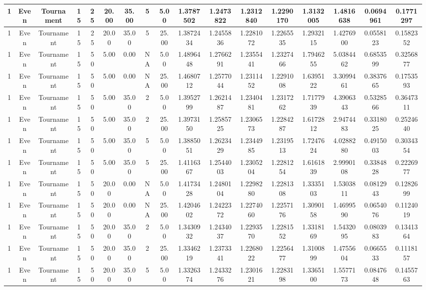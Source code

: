 \documentclass[a4paper]{article}
\begin{document}
\begin{center}
\begin{tabular}{ | c | c | c | c | c | c | c | c | c | c | c | c | c | c | c | c | c | }
		\hline
		1	&	Even	&	Tournament	&	15	&	25	&	20.00	&	35.00	&	5	&	5.00	&	1.3787502	&	1.2473822	&	1.2312840	&	1.2290170	&	1.3132005	&	1.4816638	&	0.0694961	&	0.1771297 \\
		\hline
		1	&	Even	&	Tournament	&	15	&	25	&	20.00	&	35.00	&	5	&	25.00	&	1.3872434	&	1.2455836	&	1.2281072	&	1.2265535	&	1.2932115	&	1.4276900	&	0.0558123	&	0.1582352 \\
		\hline
		1	&	Even	&	Tournament	&	15	&	50	&	5.00	&	0.00	&	NA	&	5.00	&	1.4896448	&	1.2766291	&	1.2355441	&	1.2327466	&	1.7946255	&	5.0384462	&	0.6853599	&	0.3256877 \\
		\hline
		1	&	Even	&	Tournament	&	15	&	50	&	5.00	&	0.00	&	NA	&	25.00	&	1.4680712	&	1.2577044	&	1.2311452	&	1.2291008	&	1.6395122	&	3.3099461	&	0.3837665	&	0.1753593 \\
		\hline
		1	&	Even	&	Tournament	&	15	&	50	&	5.00	&	35.00	&	2	&	5.00	&	1.3952799	&	1.2621487	&	1.2340481	&	1.2317262	&	1.7177939	&	4.3906343	&	0.5328566	&	0.3647311 \\
		\hline
		1	&	Even	&	Tournament	&	15	&	50	&	5.00	&	35.00	&	2	&	25.00	&	1.3973150	&	1.2585725	&	1.2306573	&	1.2284287	&	1.6172812	&	2.9474483	&	0.3318025	&	0.2524640 \\
		\hline
		1	&	Even	&	Tournament	&	15	&	50	&	5.00	&	35.00	&	5	&	5.00	&	1.3885051	&	1.2623429	&	1.2344985	&	1.2319513	&	1.7247624	&	4.0288280	&	0.4915003	&	0.3034354 \\
		\hline
		1	&	Even	&	Tournament	&	15	&	50	&	5.00	&	35.00	&	5	&	25.00	&	1.4116367	&	1.2544003	&	1.2305204	&	1.2281254	&	1.6161839	&	2.9990108	&	0.3384828	&	0.2226977 \\
		\hline
		1	&	Even	&	Tournament	&	15	&	50	&	20.00	&	0.00	&	NA	&	5.00	&	1.4173428	&	1.2480104	&	1.2298280	&	1.2281308	&	1.3335103	&	1.5303811	&	0.0812943	&	0.1282699 \\
		\hline
		1	&	Even	&	Tournament	&	15	&	50	&	20.00	&	0.00	&	NA	&	25.00	&	1.4204602	&	1.2422372	&	1.2274060	&	1.2257176	&	1.3090158	&	1.4699590	&	0.0654076	&	0.1124019 \\
		\hline
		1	&	Even	&	Tournament	&	15	&	50	&	20.00	&	35.00	&	2	&	5.00	&	1.3430932	&	1.2434037	&	1.2293570	&	1.2281552	&	1.3318169	&	1.5432095	&	0.0803983	&	0.1341364 \\
		\hline
		1	&	Even	&	Tournament	&	15	&	50	&	20.00	&	35.00	&	2	&	25.00	&	1.3346219	&	1.2373341	&	1.2268022	&	1.2256477	&	1.3100899	&	1.4755604	&	0.0665533	&	0.1118157 \\
		\hline
		1	&	Even	&	Tournament	&	15	&	50	&	20.00	&	35.00	&	5	&	5.00	&	1.3326374	&	1.2433276	&	1.2301621	&	1.2283198	&	1.3365100	&	1.5577173	&	0.0847648	&	0.1455763 \\

\end{tabular}
\end{center}
\end{document}
